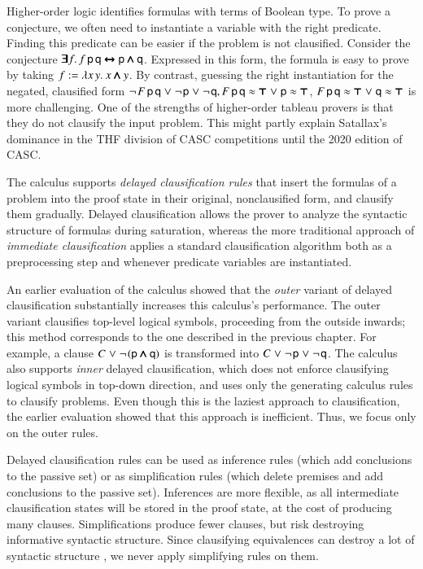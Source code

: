 Higher-order logic identifies formulas with terms of Boolean type. To prove a conjecture, we often
need to instantiate a variable with the right predicate.
Finding this predicate can be easier if the problem is not clausified.
Consider the conjecture $\pmb{\exists} f. \, f \, \mathsf{p} \, \mathsf{q} \pmb{\leftrightarrow} \mathsf{p}
\pmb{\land} \mathsf{q}$. Expressed in this form, the formula is easy to prove by taking
$f := \lambda x \, y. \> x  \pmb{\land} y$. By contrast, guessing the right
instantiation for the negated, clausified form $ \neg{\kern.2ex F \, \mathsf{p} \,
\mathsf{q}} \mathrel\lor \neg{\kern.2ex \mathsf{p}} \mathrel\lor \neg{\kern.2ex \mathsf{q}},
F \, \mathsf{p} \, \mathsf{q} \approx \pmb{\top} \mathrel\lor \mathsf{p} \approx \pmb{\top}$, $F \, \mathsf{p}
\, \mathsf{q} \approx \pmb{\top} \mathrel\lor \mathsf{q} \approx \pmb{\top}$ is more challenging.
One of the strengths of higher-order tableau provers is that they do not clausify the input
problem. This might partly explain Satallax's dominance in the THF division of CASC
competitions until the 2020 edition of CASC.

The \osup{} calculus supports \emph{delayed clausification rules} that insert
the formulas of a problem into the proof state in their original, nonclausified form, and
clausify them gradually. Delayed clausification allows the prover to analyze the
syntactic structure of formulas during saturation, whereas the more traditional
approach of \emph{immediate clausification} applies a standard clausification
algorithm \cite{nw-01-small-cnf} both as a preprocessing step and whenever
predicate variables are instantiated.

An earlier evaluation of the \osup{} calculus \cite{bbtv-21-full-ho-sup} showed
that the \emph{outer} variant of delayed clausification substantially increases
this calculus's performance. The outer variant clausifies top-level logical
symbols, proceeding from the outside inwards; this method corresponds to the one
described in the previous chapter. For example, a clause $C \mathrel\lor
\neg{\kern.2ex (\mathsf{p} \pmb{\land}\mathsf{q})}$ is transformed into $C \mathrel\lor \neg{\kern.2ex \mathsf{p}}
\mathrel\lor \neg{\kern.2ex \mathsf{q}}$. The calculus also supports \emph{inner} delayed
clausification, which does not enforce clausifying logical symbols in top-down direction, 
and uses only the generating calculus rules to clausify problems.
Even though this is the laziest approach to clausification, the earlier
evaluation \cite{bbtv-21-full-ho-sup} showed that this
approach is inefficient. Thus, we focus only on the outer rules.

Delayed clausification rules can be used as inference rules (which add conclusions
to the passive set) or as simplification rules (which delete premises and add
conclusions to the passive set).
%
Inferences are more flexible, as all
intermediate clausification states will be stored in the proof state, at the
cost of producing many clauses. Simplifications produce fewer clauses,
but risk destroying informative syntactic structure.
Since clausifying equivalences can destroy a lot of syntactic structure
\cite{gs-05-boolsup}, we never apply simplifying rules
on them.

